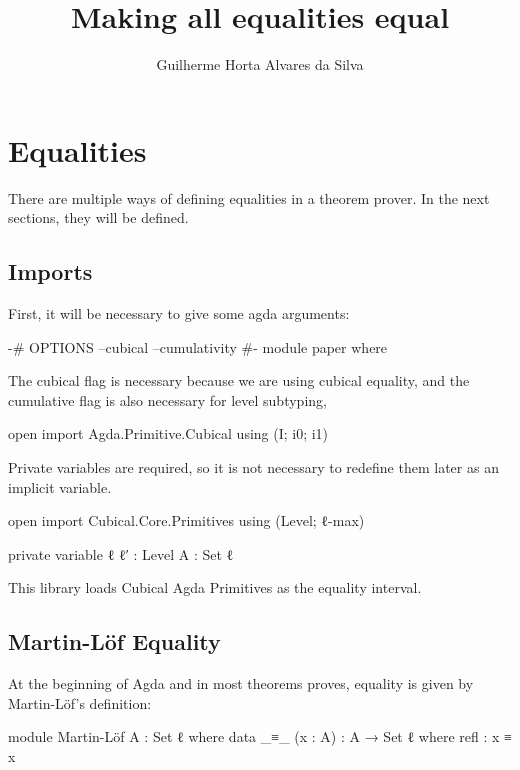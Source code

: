 \documentclass{article}
\author{Guilherme Horta Alvares da Silva}
\title{Making all equalities equal}
\begin{document}
\maketitle

\begin{abstract}

\end{abstract}


\section{Equalities}

There are multiple ways of defining equalities in a theorem prover.
In the next sections, they will be defined.

\subsection{Imports}

First, it will be necessary to give some agda arguments:

\begin{code}
{-# OPTIONS --cubical --cumulativity #-}
module paper where
\end{code}

The cubical flag is necessary because we are using cubical equality,
and the cumulative flag is also necessary for level subtyping,

\begin{code}
open import Agda.Primitive.Cubical using (I; i0; i1)
\end{code}

Private variables are required, so it is not necessary to redefine them later as an implicit variable.

\begin{code}
open import Cubical.Core.Primitives using (Level; ℓ-max)

private variable
  ℓ ℓ′ : Level
  A : Set ℓ
\end{code}

This library loads Cubical Agda Primitives as the equality interval.

\subsection{Martin-Löf Equality}

At the beginning of Agda and in most theorems proves, equality is given by Martin-Löf's definition:

\begin{code}
module Martin-Löf {A : Set ℓ} where
  data _≡_ (x : A) : A → Set ℓ where
    refl : x ≡ x
\end{code}
\end{document}
